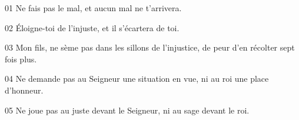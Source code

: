 01 Ne fais pas le mal, et aucun mal ne t’arrivera.

02 Éloigne-toi de l’injuste, et il s’écartera de toi.

03 Mon fils, ne sème pas dans les sillons de l’injustice, de peur d’en récolter sept fois plus.

04 Ne demande pas au Seigneur une situation en vue, ni au roi une place d’honneur.

05 Ne joue pas au juste devant le Seigneur, ni au sage devant le roi.

